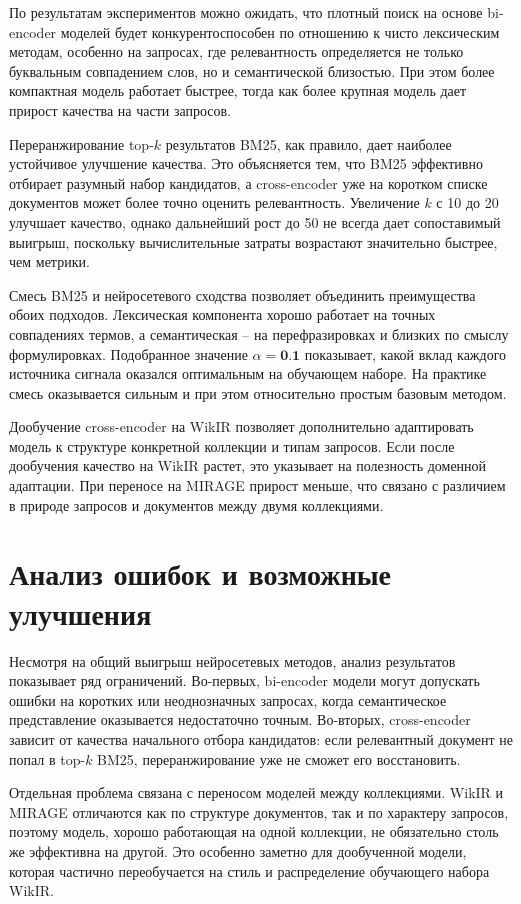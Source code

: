 \documentclass[11pt]{article}
\begin{document}
По результатам экспериментов можно ожидать, что плотный поиск на основе bi-encoder
моделей будет конкурентоспособен по отношению к чисто лексическим методам, особенно
на запросах, где релевантность определяется не только буквальным совпадением слов,
но и семантической близостью. При этом более компактная модель работает быстрее,
тогда как более крупная модель дает прирост качества на части запросов.

Переранжирование top-$k$ результатов BM25, как правило, дает наиболее устойчивое
улучшение качества. Это объясняется тем, что BM25 эффективно отбирает разумный
набор кандидатов, а cross-encoder уже на коротком списке документов может более
точно оценить релевантность. Увеличение $k$ с 10 до 20 улучшает качество,
однако дальнейший рост до 50 не всегда дает сопоставимый выигрыш, поскольку
вычислительные затраты возрастают значительно быстрее, чем метрики.

Смесь BM25 и нейросетевого сходства позволяет объединить преимущества обоих подходов.
Лексическая компонента хорошо работает на точных совпадениях термов, а семантическая
-- на перефразировках и близких по смыслу формулировках. Подобранное значение
$\alpha = \textbf{0.1}$ показывает, какой вклад каждого источника сигнала оказался
оптимальным на обучающем наборе. На практике смесь оказывается сильным и при этом
относительно простым базовым методом.

Дообучение cross-encoder на WikIR позволяет дополнительно адаптировать модель
к структуре конкретной коллекции и типам запросов. Если после дообучения качество
на WikIR растет, это указывает на полезность доменной адаптации. При переносе на
MIRAGE прирост меньше, что связано с различием в природе запросов и документов
между двумя коллекциями.

\section{Анализ ошибок и возможные улучшения}

Несмотря на общий выигрыш нейросетевых методов, анализ результатов показывает ряд
ограничений. Во-первых, bi-encoder модели могут допускать ошибки на коротких или
неоднозначных запросах, когда семантическое представление оказывается недостаточно
точным. Во-вторых, cross-encoder зависит от качества начального отбора кандидатов:
если релевантный документ не попал в top-$k$ BM25, переранжирование уже не сможет
его восстановить.

Отдельная проблема связана с переносом моделей между коллекциями. WikIR и MIRAGE
отличаются как по структуре документов, так и по характеру запросов, поэтому модель,
хорошо работающая на одной коллекции, не обязательно столь же эффективна на другой.
Это особенно заметно для дообученной модели, которая частично переобучается на
стиль и распределение обучающего набора WikIR.
\end{document}
